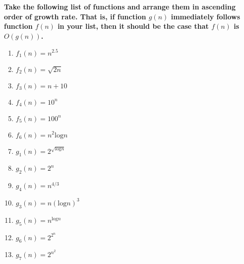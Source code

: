 
\chapter{}
\textbf{
Take the following list of functions and arrange them in ascending order of growth rate. That is, if function $g(n)$ immediately follows function $f(n)$ in your list, then it should be the case that $f(n)$ is $O(g(n))$.
}
\begin{enumerate}
  \item $f_1(n)=n^{2.5}$
  \item $f_2(n)=\sqrt{2n}$
  \item $f_3(n)=n+10$
  \item $f_4(n)=10^{n}$
  \item $f_5(n)=100^n$
  \item $f_6(n)=n^{2}\textrm{log} n$
  \item $g_1(n)=2^{\sqrt{\textrm{log} n}}$
  \item $g_2(n)=2^n$
  \item $g_4(n)=n^{4/3}$
  \item $g_3(n)=n(\textrm{log} n)^3$
  \item $g_5(n)=n^{\textrm{log} n}$
  \item $g_6(n)=2^{2^n}$
  \item $g_7(n)=2^{n^2}$
\end{enumerate}

\hspace*{\fill} \\

